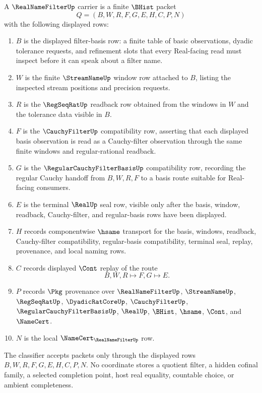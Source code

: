 \begin{definition}
\label{def:real-name-filter-carrier}
A $\RealNameFilterUp$ carrier is a finite $\BHist$ packet
$$
Q=(B,W,R,F,G,E,H,C,P,N)
$$
with the following displayed rows:
\begin{enumerate}
\item $B$ is the displayed filter-basis row: a finite table of basic observations, dyadic tolerance requests, and refinement slots that every Real-facing read must inspect before it can speak about a filter name.
\item $W$ is the finite $\StreamNameUp$ window row attached to $B$, listing the inspected stream positions and precision requests.
\item $R$ is the $\RegSeqRatUp$ readback row obtained from the windows in $W$ and the tolerance data visible in $B$.
\item $F$ is the $\CauchyFilterUp$ compatibility row, asserting that each displayed basis observation is read as a Cauchy-filter observation through the same finite windows and regular-rational readback.
\item $G$ is the $\RegularCauchyFilterBasisUp$ compatibility row, recording the regular Cauchy handoff from $B,W,R,F$ to a basis route suitable for Real-facing consumers.
\item $E$ is the terminal $\RealUp$ seal row, visible only after the basis, window, readback, Cauchy-filter, and regular-basis rows have been displayed.
\item $H$ records componentwise $\hsame$ transport for the basis, windows, readback, Cauchy-filter compatibility, regular-basis compatibility, terminal seal, replay, provenance, and local naming rows.
\item $C$ records displayed $\Cont$ replay of the route
$$
B,W,R \longmapsto F,G \longmapsto E .
$$
\item $P$ records $\Pkg$ provenance over $\RealNameFilterUp$, $\StreamNameUp$, $\RegSeqRatUp$, $\DyadicRatCoreUp$, $\CauchyFilterUp$, $\RegularCauchyFilterBasisUp$, $\RealUp$, $\BHist$, $\hsame$, $\Cont$, and $\NameCert$.
\item $N$ is the local $\NameCert_{\RealNameFilterUp}$ row.
\end{enumerate}
The classifier accepts packets only through the displayed rows $B,W,R,F,G,E,H,C,P,N$. No coordinate stores a quotient filter, a hidden cofinal family, a selected completion point, host real equality, countable choice, or ambient completeness.
\end{definition}

